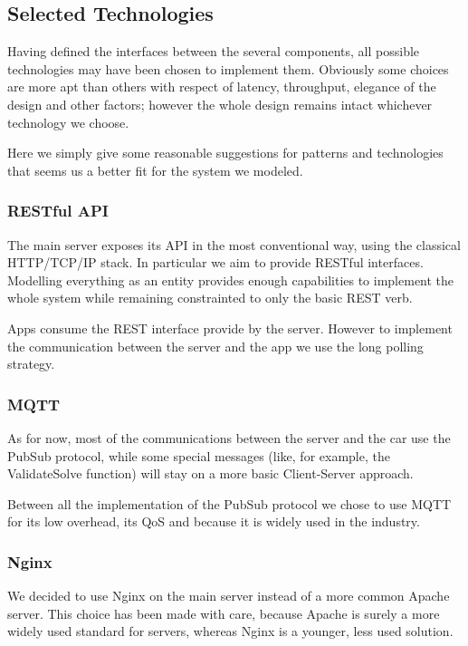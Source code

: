 \documentclass[11pt]{article} %
\begin{document}
\subsection{Selected Technologies}

Having defined the interfaces between the several components, all possible technologies may have been chosen to implement them. Obviously some choices are more apt than others with respect of latency, throughput, elegance of the design and other factors; however the whole design remains intact whichever technology we choose.

Here we simply give some reasonable suggestions for patterns and technologies that seems us a better fit for the system we modeled.

\subsubsection{RESTful API}

The main server exposes its API in the most conventional way, using the classical HTTP/TCP/IP stack. In particular we aim to provide RESTful interfaces. Modelling everything as an entity provides enough capabilities to implement the whole system while remaining constrainted to only the basic REST verb.

Apps consume the REST interface provide by the server. However to implement the communication between the server and the app we use the long polling strategy.

\subsubsection{MQTT}

As for now, most of the communications between the server and the car use the PubSub protocol, while some special messages (like, for example, the ValidateSolve function) will stay on a more basic Client-Server approach.

 Between all the implementation of the PubSub protocol we chose to use MQTT for its low overhead, its QoS and because it is widely used in the industry.

\subsubsection{Nginx}

We decided to use Nginx on the main server instead of a more common Apache server. This choice has been made with care, because Apache is surely a more widely used standard for servers, whereas Nginx is a younger, less used solution. 
\end{document}
